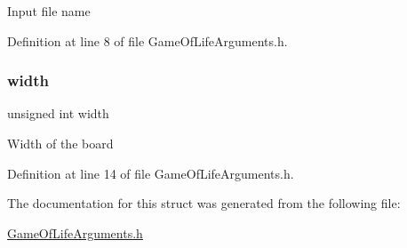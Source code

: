 Input file name 

Definition at line 8 of file Game\+Of\+Life\+Arguments.\+h.

\mbox{\label{struct_game_of_life_arguments_aca34d28e3d8bcbcadb8edb4e3af24f8c}} 
\subsubsection{\texorpdfstring{width}{width}}
{\footnotesize\ttfamily unsigned int width}

Width of the board 

Definition at line 14 of file Game\+Of\+Life\+Arguments.\+h.



The documentation for this struct was generated from the following file\+:\begin{DoxyCompactItemize}
\item 
\mbox{\hyperlink{_game_of_life_arguments_8h}{Game\+Of\+Life\+Arguments.\+h}}\end{DoxyCompactItemize}
